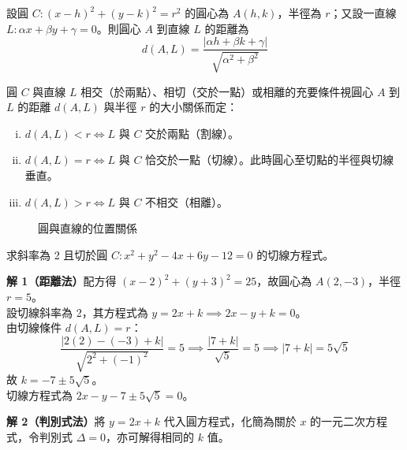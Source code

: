 設圓 $C : (x-h)^2 + (y-k)^2 = r^2$ 的圓心為 $A(h,k)$，半徑為 $r$；又設一直線 $L : \alpha x + \beta y + \gamma = 0$。則圓心 $A$ 到直線 $L$ 的距離為
\begin{equation}
d(A, L) = \frac{|\alpha h + \beta k + \gamma|}{\sqrt{\alpha^2 + \beta^2}} \label{eq:b4-3-5-dist}
\end{equation}

\begin{proposition}
圓 $C$ 與直線 $L$ 相交（於兩點）、相切（交於一點）或相離的充要條件視圓心 $A$ 到 $L$ 的距離 $d(A,L)$ 與半徑 $r$ 的大小關係而定：
\begin{enumerate}[(i)]
  \item $d(A, L) < r \iff L$ 與 $C$ 交於兩點（割線）。
  \item $d(A, L) = r \iff L$ 與 $C$ 恰交於一點（切線）。此時圓心至切點的半徑與切線垂直。
  \item $d(A, L) > r \iff L$ 與 $C$ 不相交（相離）。
\end{enumerate}
\end{proposition}

\begin{figure}[htbp]
\centering
{}
\caption{圓與直線的位置關係}
\label{fig:b4-3-35}
\end{figure}

\begin{example}
求斜率為 2 且切於圓 $C : x^2 + y^2 - 4x + 6y - 12 = 0$ 的切線方程式。

\textbf{解 1（距離法）}\quad 配方得 $(x-2)^2 + (y+3)^2 = 25$，故圓心為 $A(2,-3)$，半徑 $r = 5$。\\
設切線斜率為 2，其方程式為 $y = 2x + k \implies 2x - y + k = 0$。\\
由切線條件 $d(A, L) = r$：
\[ \frac{|2(2) - (-3) + k|}{\sqrt{2^2 + (-1)^2}} = 5 \implies \frac{|7 + k|}{\sqrt{5}} = 5 \implies |7 + k| = 5\sqrt{5} \]
故 $k = -7 \pm 5\sqrt{5}$。\\
切線方程式為 $2x - y - 7 \pm 5\sqrt{5} = 0$。

\textbf{解 2（判別式法）}\quad 將 $y = 2x + k$ 代入圓方程式，化簡為關於 $x$ 的一元二次方程式，令判別式 $\Delta = 0$，亦可解得相同的 $k$ 值。
\end{example}

